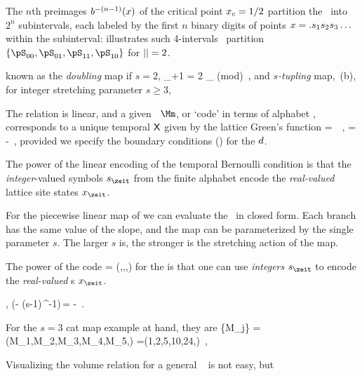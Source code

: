 \begin{description}
The $n$th
preimages $b^{-(n-1)}(x)$ of the critical point $x_c=1/2$
partition the \statesp\ into $2^n$ subintervals, each labeled
by the first $n$ binary digits of points $x=.{s_{1}}
{s_{2}} {s_{3}} \ldots $ within the subinterval:
 illustrates such 4-intervals \statesp\
partition $\{\pS_{00},\pS_{01},\pS_{11},\pS_{10}\}$  for
${||}=2$.

known as the {\em doubling} map if ${s}=2$,
\beq
\ssp_{\zeit+1} = 2 \ssp_{\zeit} \;\; (\mbox{mod})
\,,
and {\em ${s}$-tupling} map, \,(b), for
integer stretching parameter ${s}\geq3$,

The relation is linear, and a given \brick\ $\Mm$, or `code' in terms of
alphabet  \refeq{base-sAlph}, corresponds to a unique temporal {\lattstate} $\mathsf{X}$ given by the lattice Green's function
\beq
\Xx
= \gd\,\Mm
\,,\qquad
\gd = - 
\,,
provided we specify the boundary conditions ({\bcs}) for the {\shiftOp}
$d$.

The power of the linear encoding of the {temporal
Bernoulli} condition  is that the
\emph{integer}-valued symbols $\Ssym{\zeit}$ from the finite alphabet
\refeq{base-sAlph} encode the \emph{real-valued} lattice site states
$\ssp_{\zeit}$.

For the  %
piecewise linear map of 
we can evaluate the \dzeta\ in closed form.
Each branch has the same value of the
slope, and the map can be parameterized
by the single parameter ${s}$.
The larger ${s}$ is, the stronger is the stretching action of the map.

The power of the code %
\beq
\transp{\Mm} %
             = (\Ssym{\zeit},,\cdots,)
\ee{linCode}
for the {\templatt}  is that one can use \emph{integers}
$\Ssym{\zeit}$ to encode the \emph{real-valued} {\lattstate}s $\ssp_{\zeit}$.

,
\beq
(\partial - (s-1)\,\shift^{-1})\,\Xx = -\Mm
\,.

For
the $s=3$ cat map example at hand, they are
\beq
\{M_j\} = (M_1,M_2,M_3,M_4,M_5,\cdots)
=(1,2,5,10,24,\cdots)
\,,

Visualizing the volume relation  for a general \cl{}\dmn\
{\fundPip} is not easy, but


\end{description}
